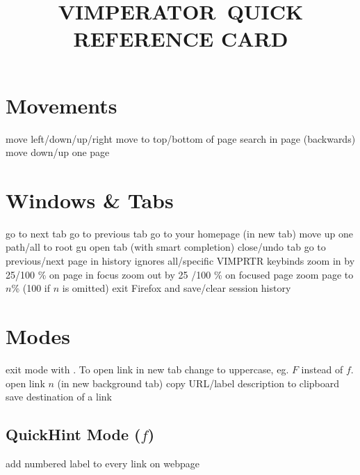 
\def\content{VIMPERATOR}
\def\versionnumber{0.1}  %
\def\year{2014}
\def\month{Jun}
\def\version{v\versionnumber\ \month\ \year}




\title{\uppercase{\content\ quick reference card}}

\shortintro

\vskip 0.5cm

\section{Movements}{}
	{move left/down/up/right}
	{move to top/bottom of page}
	{search in page (backwards)}
\cmdS{\space~\shift\space}	{move down/up one page}

\section{Windows \& Tabs}{}
	{go to next tab}
	{go to previous tab}
	{go to your homepage (in new tab)}
	{move up one path/all to root}
	{gu}
	{open tab (with smart completion)}
	{close/undo tab}
	{go to previous/next page in history}
	{ignores all/specific VIMPRTR keybinds}
	{}
	{zoom in by 25/100 \% on page in focus}
	{zoom out by 25 /100 \% on focused page}
	{zoom page to $n$\% (100 if $n$ is omitted)}
	{exit Firefox and save/clear session history}

\section{Modes}{exit mode with . To open link in new tab change to uppercase, eg. $F$ instead of $f$.}
	{open link $n$ (in new background tab)}
	{copy URL/label description to clipboard}
	{save destination of a link}
\subsection{QuickHint Mode ($f$)}{add numbered label to every link on webpage}
